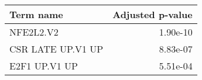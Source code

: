 \begin{tabular}{lr}
\toprule
        Term name &  Adjusted p-value \\
\midrule
        NFE2L2.V2 &          1.90e-10 \\
CSR LATE UP.V1 UP &          8.83e-07 \\
    E2F1 UP.V1 UP &          5.51e-04 \\
\bottomrule
\end{tabular}

